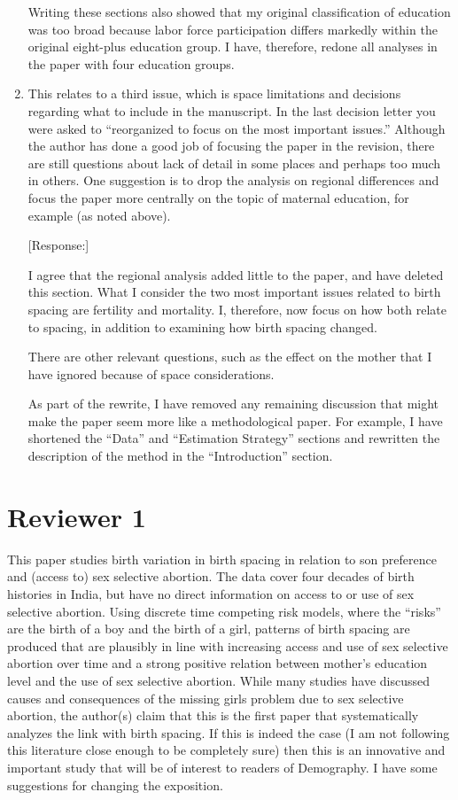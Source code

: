 \documentclass[letterpaper,12pt]{article}
\begin{document}
\begin{enumerate}
Writing these sections also showed that my original classification of
education was too broad because labor force participation differs
markedly within the original eight-plus education group. I have,
therefore, redone all analyses in the paper with four education groups.

\item This relates to a third issue, which is space limitations and
decisions regarding what to include in the manuscript. In the last
decision letter you were asked to “reorganized to focus on the most
important issues.” Although the author has done a good job of focusing
the paper in the revision, there are still questions about lack of
detail in some places and perhaps too much in others. One suggestion is
to drop the analysis on regional differences and focus the paper more
centrally on the topic of maternal education, for example (as noted
above).

[Response:]

I agree that the regional analysis added little to the paper, and 
have deleted this section. What I consider the two most
important issues related to birth spacing are fertility and mortality.
I, therefore, now focus on how both relate to spacing, in addition to
examining how birth spacing changed.

There are other relevant questions, such as the effect on the mother
that I have ignored because of space considerations.

As part of the rewrite, I have removed any remaining discussion that
might make the paper seem more like a methodological paper. For example,
I have shortened the ``Data'' and ``Estimation Strategy'' sections and
rewritten the description of the method in the ``Introduction'' section.

\end{enumerate}

\newpage

\section*{Reviewer 1}

This paper studies birth variation in birth spacing in relation to son
preference and (access to) sex selective abortion. The data cover four
decades of birth histories in India, but have no direct information on
access to or use of sex selective abortion. Using discrete time
competing risk models, where the “risks” are the birth of a boy and the
birth of a girl, patterns of birth spacing are produced that are
plausibly in line with increasing access and use of sex selective
abortion over time and a strong positive relation between mother’s
education level and the use of sex selective abortion. While many
studies have discussed causes and consequences of the missing girls
problem due to sex selective abortion, the author(s) claim that this is
the first paper that systematically analyzes the link with birth
spacing. If this is indeed the case (I am not following this literature
close enough to be completely sure) then this is an innovative and
important study that will be of interest to readers of Demography. I
have some suggestions for changing the exposition.
\end{document}
